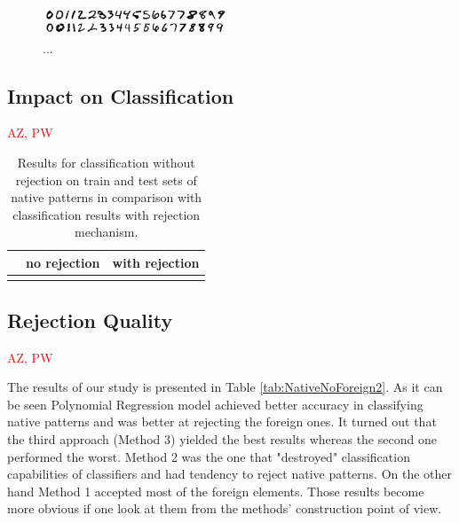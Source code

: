 \documentclass{llncs}
\begin{document}
\begin{figure}[!t]
  \centering
  \includegraphics[width=0.49\textwidth]{_Figures/native}
  \caption{...}
\label{fig:nativeforeignpatterns}
\end{figure}


\subsection{Impact on Classification}
\textcolor{red} {AZ, PW}

\begin{table}[t]
\centering
\caption{Results for classification without rejection on train and test sets of native patterns in comparison with classification results with rejection mechanism. }
\vspace{3pt}
\setlength{\tabcolsep}{6pt}
\renewcommand{\arraystretch}{1}
\begin{tabular}{|r||cc|cc|}
\hline
& \multicolumn{2}{c|}{no rejection} & \multicolumn{2}{c|}{with rejection}  \\
\hline
&&&&\\
\hline
\end{tabular}
\vspace{12pt}
\label{tab:NativeNoForeign}
\end{table}


\subsection{Rejection Quality}
\textcolor{red} {AZ, PW}

The results of our study is presented in Table \ref{tab:NativeNoForeign2}. As it can be seen Polynomial Regression model achieved better accuracy in classifying native patterns and was better at rejecting the foreign ones. It turned out that the third approach (Method 3) yielded the best results whereas the second one performed the worst. Method 2 was the one that "destroyed" classification capabilities of classifiers and had tendency to reject native patterns. On the other hand Method 1 accepted most of the foreign elements. Those results become more obvious if one look at them from the methods' construction point of view. \\
\end{document}
